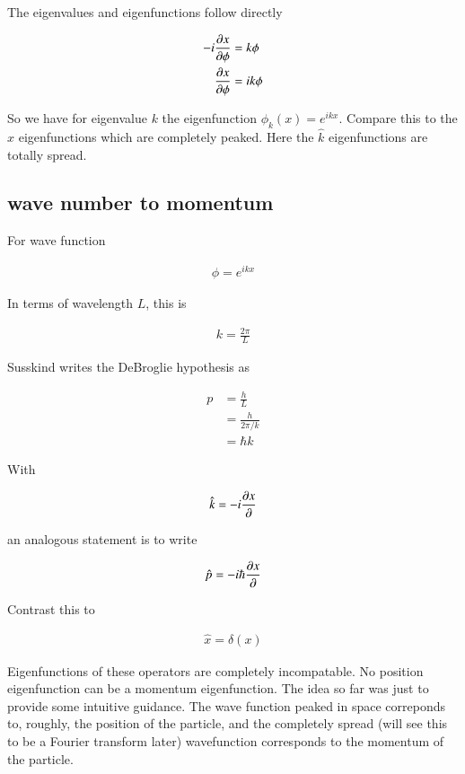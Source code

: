 \documentclass{article}
\newcommand{\hatk}[0]{\hat{k}}
\newcommand{\hatx}[0]{\hat{x}}
\newcommand{\hatp}[0]{\hat{p}}
\begin{document}
The eigenvalues and eigenfunctions follow directly

\begin{align*}
-i \frac{\partial{x}}{\partial {\phi}} &= k \phi \\
\frac{\partial{x}}{\partial {\phi}} &= i k \phi
\end{align*}

So we have for eigenvalue $k$ the eigenfunction $\phi_k(x) = e^{i k x}$.  Compare this to the $\hatx$ eigenfunctions which are completely peaked.  Here the $\hatk$ eigenfunctions are totally spread.

\subsection{ wave number to momentum }

For wave function

\begin{align*}
\phi = e^{ikx}
\end{align*}

In terms of wavelength $L$, this is

\begin{align*}
k = \frac{2\pi}{L}
\end{align*}

Susskind writes the DeBroglie hypothesis as 

\begin{align*}
p 
&= \frac{h}{L} \\
&= \frac{h}{2\pi/k} \\
&= {\hbar}k
\end{align*}

With

\begin{align*}
\hatk = -i\PD{x}{}
\end{align*}

an analogous statement is to write

\begin{align*}
\hatp = -i\hbar \PD{x}{}
\end{align*}

Contrast this to 

\begin{align*}
\hatx = \delta(x)
\end{align*}

Eigenfunctions of these operators are completely incompatable.  No position eigenfunction can be a momentum eigenfunction.  The idea so far was just to provide some intuitive guidance.  The wave function peaked in space correponds to, roughly, the position of the particle, and the completely spread (will see this to be a Fourier transform later) wavefunction corresponds to the momentum of the particle.
\end{document}
